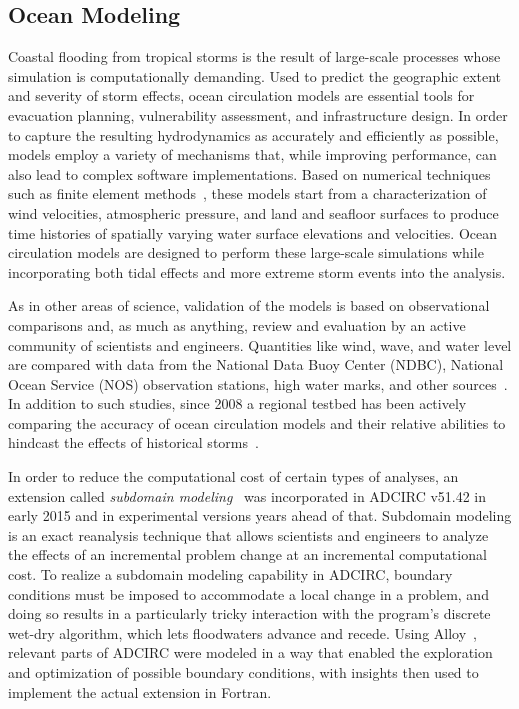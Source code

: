 \documentclass[12pt]{article}
\begin{document}
\subsection{Ocean Modeling}

Coastal flooding from tropical storms is the result of large-scale
processes whose simulation is computationally demanding.  Used to
predict the geographic extent and severity of storm effects, ocean
circulation models are essential tools for evacuation planning,
vulnerability assessment, and infrastructure design.  In order to
capture the resulting hydrodynamics as accurately and efficiently as
possible, models employ a variety of mechanisms that, while improving
performance, can also lead to complex software implementations.  Based
on numerical techniques such as finite element
methods~\citep{zienkiewicz2013}, these models start from a
characterization of wind velocities, atmospheric pressure, and land
and seafloor surfaces to produce time histories of spatially varying
water surface elevations and velocities.  Ocean circulation models are
designed to perform these large-scale simulations while incorporating
both tidal effects and more extreme storm events into the analysis.

As in other areas of science, validation of the models is based on
observational comparisons and, as much as anything, review and
evaluation by an active community of scientists and engineers.
Quantities like wind, wave, and water level are compared with data
from the National Data Buoy Center (NDBC), National Ocean Service
(NOS) observation stations, high water marks, and other
sources~\citep{hanson2013}.  In addition to such studies, since 2008 a
regional testbed has been actively comparing the accuracy of ocean
circulation models and their relative abilities to hindcast the
effects of historical storms~\citep{sheng2012}.

In order to reduce the computational cost of certain types of analyses, an extension called \emph{subdomain modeling}~\citep{baugh2015} was incorporated in ADCIRC v51.42 in early 2015 and in experimental versions years ahead of that. Subdomain modeling is an exact reanalysis technique that allows scientists and engineers to analyze the effects of an incremental problem change at an incremental computational cost. To realize a subdomain modeling capability in ADCIRC, boundary conditions must be imposed to accommodate a local change in a problem, and doing so results in a particularly tricky interaction with the program's discrete wet-dry algorithm, which lets floodwaters advance and recede.  Using Alloy~\citep{baugh2017}, relevant parts of ADCIRC were modeled in a way that enabled the exploration and optimization of possible boundary conditions, with insights then used to implement the actual extension in Fortran.
\end{document}
